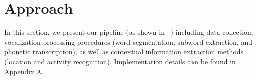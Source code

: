 \section{Approach}
\label{sec:approach}


In this section, we present our pipeline (as shown in ~) including data collection, vocalization processing procedures (word segmentation, subword extraction, and phonetic transcription), as well as contextual information extraction methods (location and activity recognition). Implementation details can be found in Appendix A.

